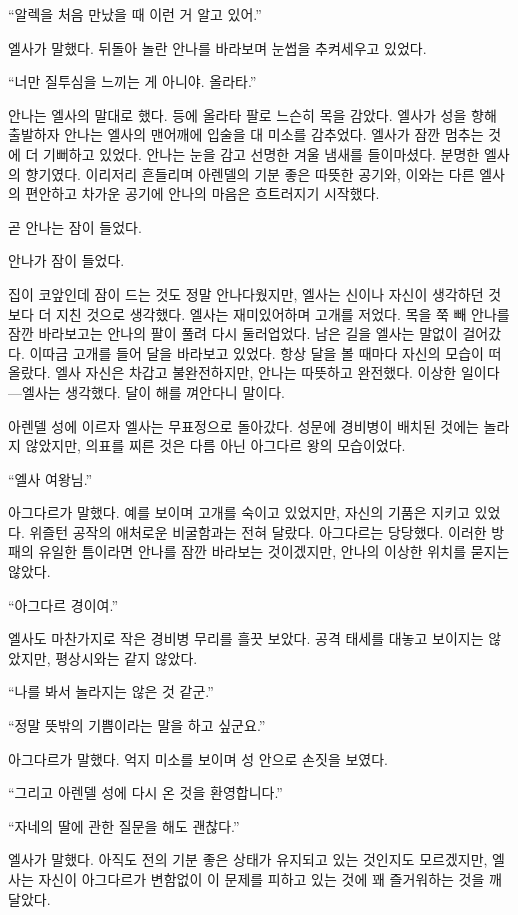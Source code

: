 ``알렉을 처음 만났을 때 이런 거 알고 있어.''

엘사가 말했다. 뒤돌아 놀란 안나를 바라보며 눈썹을 추켜세우고 있었다.

``너만 질투심을 느끼는 게 아니야. 올라타.''

안나는 엘사의 말대로 했다. 등에 올라타 팔로 느슨히 목을 감았다. 엘사가 성을 향해 출발하자 안나는 엘사의 맨어깨에 입술을 대 미소를 감추었다. 엘사가 잠깐 멈추는 것에 더 기뻐하고 있었다. 안나는 눈을 감고 선명한 겨울 냄새를 들이마셨다. 분명한 엘사의 향기였다. 이리저리 흔들리며 아렌델의 기분 좋은 따뜻한 공기와, 이와는 다른 엘사의 편안하고 차가운 공기에 안나의 마음은 흐트러지기 시작했다.

곧 안나는 잠이 들었다.

\textbreak

안나가 잠이 들었다.

집이 코앞인데 잠이 드는 것도 정말 안나다웠지만, 엘사는 신이나 자신이 생각하던 것보다 더 지친 것으로 생각했다. 엘사는 재미있어하며 고개를 저었다. 목을 쭉 빼 안나를 잠깐 바라보고는 안나의 팔이 풀려 다시 둘러업었다. 남은 길을 엘사는 말없이 걸어갔다. 이따금 고개를 들어 달을 바라보고 있었다. 항상 달을 볼 때마다 자신의 모습이 떠올랐다. 엘사 자신은 차갑고 불완전하지만, 안나는 따뜻하고 완전했다. 이상한 일이다—엘사는 생각했다. 달이 해를 껴안다니 말이다.

아렌델 성에 이르자 엘사는 무표정으로 돌아갔다. 성문에 경비병이 배치된 것에는 놀라지 않았지만, 의표를 찌른 것은 다름 아닌 아그다르 왕의 모습이었다.

``엘사 여왕님.''

아그다르가 말했다. 예를 보이며 고개를 숙이고 있었지만, 자신의 기품은 지키고 있었다. 위즐턴 공작의 애처로운 비굴함과는 전혀 달랐다. 아그다르는 당당했다. 이러한 방패의 유일한 틈이라면 안나를 잠깐 바라보는 것이겠지만, 안나의 이상한 위치를 묻지는 않았다.

``아그다르 경이여.''

엘사도 마찬가지로 작은 경비병 무리를 흘끗 보았다. 공격 태세를 대놓고 보이지는 않았지만, 평상시와는 같지 않았다.

``나를 봐서 놀라지는 않은 것 같군.''

``정말 뜻밖의 기쁨이라는 말을 하고 싶군요.''

아그다르가 말했다. 억지 미소를 보이며 성 안으로 손짓을 보였다.

``그리고 아렌델 성에 다시 온 것을 환영합니다.''

``자네의 딸에 관한 질문을 해도 괜찮다.''

엘사가 말했다. 아직도 전의 기분 좋은 상태가 유지되고 있는 것인지도 모르겠지만, 엘사는 자신이 아그다르가 변함없이 이 문제를 피하고 있는 것에 꽤 즐거워하는 것을 깨달았다.

